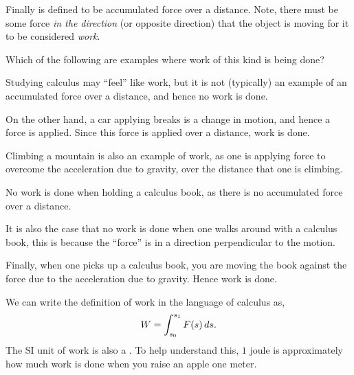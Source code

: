 \documentclass{ximera}
\begin{document}
	
	Finally  is defined to be accumulated force over a
	distance. Note, there must be some force \textit{in the direction} (or
	opposite direction) that the object is moving for it to be considered
	\textit{work}.
	\begin{question}
		Which of the following are examples where work of this kind is being done?
		\begin{selectAll}
		\end{selectAll}
		\begin{feedback}
			Studying calculus may ``feel'' like work, but it is not
			(typically) an example of an accumulated force over a distance,
			and hence no work is done.
			
			On the other hand, a car applying breaks is a change in motion, and
			hence a force is applied. Since this force is applied over a
			distance, work is done.
			
			Climbing a mountain is also an example of work, as one is applying
			force to overcome the acceleration due to gravity, over the
			distance that one is climbing.
			
			No work is done when holding a calculus book, as there is no
			accumulated force over a distance.
			
			It is also the case that no work is done when one walks around
			with a calculus book, this is because the ``force'' is in a
			direction perpendicular to the motion.
			
			Finally, when one picks up a calculus book, you are moving the
			book against the force due to the acceleration due to
			gravity. Hence work is done.
		\end{feedback}
	\end{question}
	We can write the definition of work in the language of calculus as,
	\[
	W = \int_{s_0}^{s_1} F(s) \mathop{}\!d s.
	\]
	The SI unit of work is also a . To help understand this,
	$1$ joule is approximately how much work is done when you raise an
	apple one meter.
	
\end{document}
